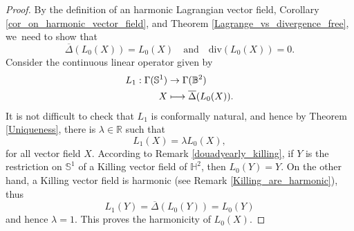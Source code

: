 \documentclass[10pt]{amsart}
\newcommand\mto{\mathchoice{\longmapsto}{\mapsto}{\mapsto}{\mapsto}}
\theoremstyle{plain}
\theoremstyle{definition}
\begin{document}
\begin{proof}
By the definition of an harmonic Lagrangian vector field, Corollary \ref{cor_on_harmonic_vector_field}, and Theorem \ref{Lagrange_vs_divergence_free}, we~need to show that \begin{equation}
\overline{\Delta}(L_0(X))=L_0(X) \quad\text{and}\quad \mathrm{div}(L_0(X))=0.
\end{equation}
Consider the continuous linear operator given by
\[
\begin{aligned}
L_1:\Gamma(\mathbb{S}^1) & \to \Gamma(\mathbb{B}^2) \\
X & \mto \overline{\Delta}(L_0(X)).
\end{aligned}
\]
It is not difficult to check that $L_1$ is conformally natural, and hence by Theorem \ref{Uniqueness}, there is $\lambda\in\mathbb{R}$ such that
\begin{equation}\label{eq_harmo_L0}
L_1(X)=\lambda L_0(X),
\end{equation} for all vector field $X$.
According to Remark \ref{douadyearly_killing}, if $Y$ is the restriction on $\mathbb{S}^1$ of a Killing vector field of $\mathbb{H}^2$, then $L_0(Y)=Y$. On the other hand, a Killing vector field is harmonic (see Remark \ref{Killing_are_harmonic}), thus
\[
L_1(Y)=\overline{\Delta}(L_0(Y))=L_0(Y)
\]
and hence $\lambda=1$. This proves the harmonicity of $L_0(X)$.


\end{proof}
\end{document}

